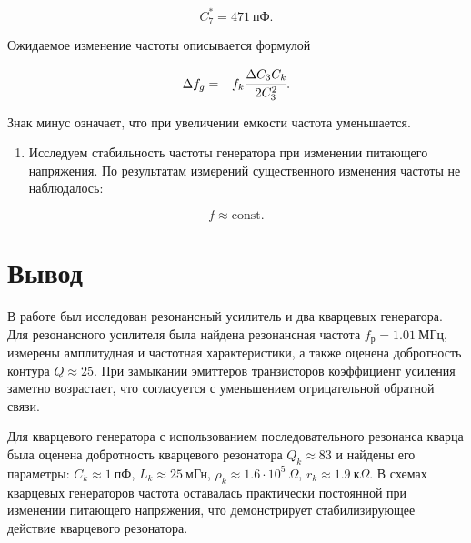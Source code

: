 \documentclass[a4paper,12pt]{article}
\begin{document}
\begin{equation*}
    C_7^{*} = 471~\text{пФ}.
\end{equation*}

Ожидаемое изменение частоты описывается формулой

\begin{equation*}
    \Delta f_g =
    -
    f_k
    \cfrac{\Delta C_3 C_k}{2 C_3^2}.
\end{equation*}

Знак минус означает, что при увеличении емкости частота уменьшается.

\begin{enumerate}[resume]
    \item Исследуем стабильность частоты генератора при изменении питающего напряжения. По результатам измерений существенного изменения частоты не наблюдалось:
\end{enumerate}

\begin{equation*}
    f \approx \mathrm{const}.
\end{equation*}

\section{Вывод}

В работе был исследован резонансный усилитель и два кварцевых генератора. Для резонансного усилителя была найдена резонансная частота $f_\text{р} = 1.01~\text{МГц}$, измерены амплитудная и частотная характеристики, а также оценена добротность контура $Q \approx 25$. При замыкании эмиттеров транзисторов коэффициент усиления заметно возрастает, что согласуется с уменьшением отрицательной обратной связи.

Для кварцевого генератора с использованием последовательного резонанса кварца была оценена добротность кварцевого резонатора $Q_k \approx 83$ и найдены его параметры: $C_k \approx 1~\text{пФ}$, $L_k \approx 25~\text{мГн}$, $\rho_k \approx 1.6 \cdot 10^5~\Omega$, $r_k \approx 1.9~\text{к}\Omega$. В схемах кварцевых генераторов частота оставалась практически постоянной при изменении питающего напряжения, что демонстрирует стабилизирующее действие кварцевого резонатора.
\end{document}
